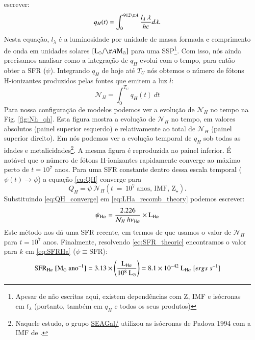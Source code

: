 escrever:
\begin{equation}
	q_H(t) = \int_0^{912\AA} \frac{l_\lambda\ \lambda}{h c} d\lambda.
	\label{eq:qH}
\end{equation}
\noindent Nesta equação, $l_\lambda$ é a luminosidade por unidade de massa formada e comprimento de
onda em unidades solares $[\textrm{L}_\odot/\AA\textrm{M}_\odot]$ para uma SSP\footnote{Apesar de
não escritas aqui, existem dependências com Z, IMF e isócronas em $l_\lambda$ (portanto, também em
$q_H$ e todos os seus produtos)}. Com isso, nós ainda precisamos analisar como a integração de
$q_H$ evolui com o tempo, para então obter a SFR ($\psi$). Integrando $q_H$ de hoje até $T_U$ nós
obtemos o número de fótons H-ionizantes produzidos pelas fontes que emitem a luz $l$:
\begin{equation}
	\mathcal{N}_H = \int_0^{T_U} q_H(t)\ dt
\end{equation}
Para nossa configuração de modelos podemos ver a evolução de $\mathcal{N}_H$ no tempo na Fig.
\ref{fig:Nh_qh}. Esta figura mostra a evolução de $\mathcal{N}_H$ no tempo, em valores absolutos
(painel superior esquerdo) e relativamente ao total de $\mathcal{N}_H$ (painel superior direito).
Em \citet[Fig. 2b]{CidFernandes.etal.2011a} nós podemos ver a evolução temporal de $q_H$ sob
todas as idades e metalicidades\footnote{Naquele estudo, o
grupo \href{http://starlight.ufsc.br}{SEAGal/\STARLIGHT} utilizou as isócronas de Padova 1994 com a
IMF de \citet{Chabrier.2003a}.}. A mesma figura é reproduzida no painel inferior. É notável que o
número de fótons H-ionizantes rapidamente converge ao máximo perto de $t = 10^7$ anos. Para uma SFR
constante dentro dessa escala temporal ($\psi(t)\rightarrow \psi$) a equação \eqref{eq:QH} converge
para
\begin{equation}
	Q_H = \psi\ \mathcal{N}_H(t\ =\ 10^7\ \textrm{anos, IMF, Z}{}_\star).
	\label{eq:QH_converge}
\end{equation}
\noindent Substituindo \eqref{eq:QH_converge} em \eqref{eq:LHa_recomb_theory} podemos escrever:
\begin{equation}
	\psi_{\Halpha} = \frac{2.226}{\mathcal{N}_H\ h \nu_{\Halpha}} \times \LHalpha
	\label{eq:SFR_theoric}
\end{equation}
\noindent Este método nos dá uma SFR recente, em termos de que usamos o valor de $\mathcal{N}_H$
para $t = 10^7$ anos. Finalmente, resolvendo \eqref{eq:SFR_theoric} encontramos o valor para $k$ em
\eqref{eq:SFRHa} ($\psi \equiv \mathrm{SFR}$):
\begin{equation}
	\mathrm{SFR}_{\Halpha}\ [\mathrm{M}_\odot\ \mathrm{ano}^{-1}] = 3.13 \times
	\left(\frac{\LHalpha}{10^8\ \mathrm{L}_\odot}\right) = 8.1 \times 10^{-42}\ \LHalpha\ [ergs\ s^{-1}]
	\label{eq:SFRNeb}
\end{equation}

